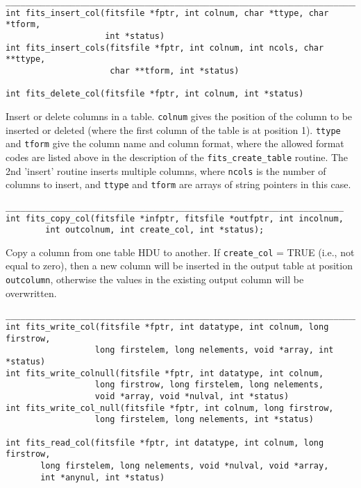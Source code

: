 \documentclass[11pt]{article}
\begin{document}
\begin{verbatim}
_________________________________________________________________________
int fits_insert_col(fitsfile *fptr, int colnum, char *ttype, char *tform,
                    int *status)
int fits_insert_cols(fitsfile *fptr, int colnum, int ncols, char **ttype,
                     char **tform, int *status)

int fits_delete_col(fitsfile *fptr, int colnum, int *status)
\end{verbatim}

Insert or delete columns in a table.  {\tt colnum} gives the position
of the column to be inserted or deleted (where the first column of the
table is at position 1).  {\tt ttype} and {\tt tform} give the column
name and column format, where the allowed format codes are listed above
in the description of the {\tt fits\_create\_table} routine.  The 2nd
'insert' routine inserts multiple columns, where {\tt ncols} is the
number of columns to insert, and  {\tt ttype} and {\tt tform} are
arrays of string pointers in this case.

\begin{verbatim}
____________________________________________________________________
int fits_copy_col(fitsfile *infptr, fitsfile *outfptr, int incolnum,
        int outcolnum, int create_col, int *status);
\end{verbatim}

Copy a column from one table HDU to another.  If {\tt create\_col} = TRUE (i.e., not equal to zero),
then a new column will be inserted in the output table at position
{\tt outcolumn}, otherwise the values in the existing output column will be
overwritten. 

\begin{verbatim}
__________________________________________________________________________
int fits_write_col(fitsfile *fptr, int datatype, int colnum, long firstrow,
                  long firstelem, long nelements, void *array, int *status)
int fits_write_colnull(fitsfile *fptr, int datatype, int colnum, 
                  long firstrow, long firstelem, long nelements, 
                  void *array, void *nulval, int *status)
int fits_write_col_null(fitsfile *fptr, int colnum, long firstrow,
                  long firstelem, long nelements, int *status)

int fits_read_col(fitsfile *fptr, int datatype, int colnum, long firstrow,
       long firstelem, long nelements, void *nulval, void *array, 
       int *anynul, int *status)

\end{verbatim}
\end{document}
